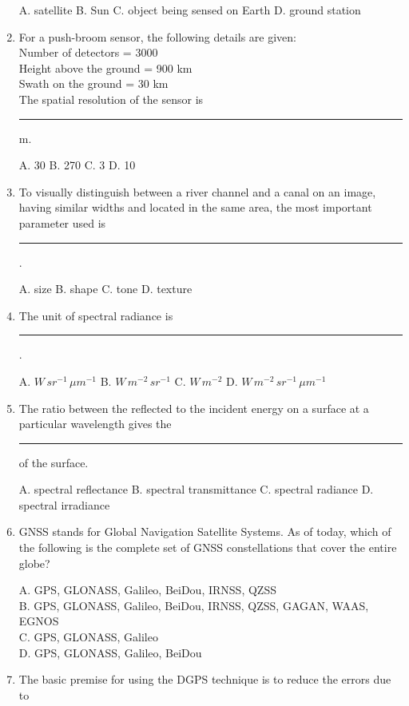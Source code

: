 \documentclass[journal,12pt,onecolumn]{IEEEtran}
\begin{document}
\begin{enumerate}
    A. satellite \quad
    B. Sun \quad
    C. object being sensed on Earth \quad
    D. ground station

    \item For a push-broom sensor, the following details are given: \\
    Number of detectors = 3000 \\
    Height above the ground = 900 km \\
    Swath on the ground = 30 km \\  
    The spatial resolution of the sensor is \rule{3cm}{0.15mm} m.

    A. 30 \quad
    B. 270 \quad
    C. 3 \quad
    D. 10

    \item To visually distinguish between a river channel and a canal on an image, having similar widths and located in the same area, the most important parameter used is \rule{3cm}{0.15mm}.

    A. size \quad
    B. shape \quad
    C. tone \quad
    D. texture

    \item The unit of spectral radiance is \rule{3cm}{0.15mm}.

    A. $W \, sr^{-1} \, \mu m^{-1}$ \quad
    B. $W \, m^{-2} \, sr^{-1}$ \quad
    C. $W \, m^{-2}$ \quad
    D. $W \, m^{-2} \, sr^{-1} \, \mu m^{-1}$

    \item The ratio between the reflected to the incident energy on a surface at a particular wavelength gives the \rule{3cm}{0.15mm} of the surface.

    A. spectral reflectance \quad
    B. spectral transmittance \quad
    C. spectral radiance \quad
    D. spectral irradiance

    \item GNSS stands for Global Navigation Satellite Systems. As of today, which of the following is the complete set of GNSS constellations that cover the entire globe?

    A. GPS, GLONASS, Galileo, BeiDou, IRNSS, QZSS \\
    B. GPS, GLONASS, Galileo, BeiDou, IRNSS, QZSS, GAGAN, WAAS, EGNOS \\
    C. GPS, GLONASS, Galileo \\
    D. GPS, GLONASS, Galileo, BeiDou

    \item The basic premise for using the DGPS technique is to reduce the errors due to


\end{enumerate}
\end{document}

